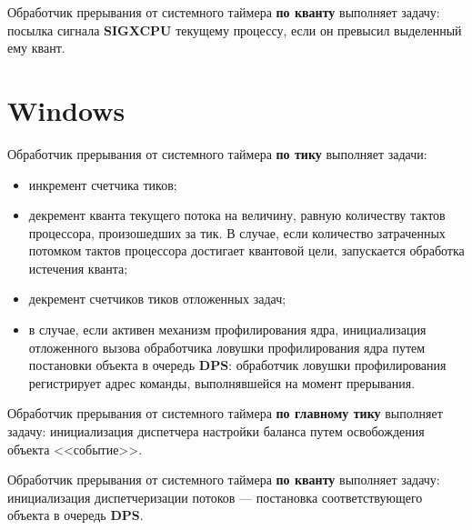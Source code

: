 Обработчик прерывания от системного таймера \textbf{по кванту} выполняет задачу: посылка сигнала \textbf{SIGXCPU} текущему процессу, если он превысил выделенный ему квант.

\section{Windows}

Обработчик прерывания от системного таймера \textbf{по тику} выполняет задачи:
\begin{itemize}
	\item инкремент счетчика тиков;
	\item декремент кванта текущего потока на величину, равную количеству тактов процессора, произошедших за тик. В случае, если количество затраченных потомком тактов процессора достигает квантовой цели, запускается обработка истечения кванта;
	\item декремент счетчиков тиков отложенных задач;
	\item в случае, если активен механизм профилирования ядра, инициализация отложенного вызова обработчика ловушки профилирования ядра путем постановки объекта в очередь \textbf{DPS}: обработчик ловушки профилирования регистрирует адрес команды, выполнявшейся на момент прерывания.
\end{itemize}

Обработчик прерывания от системного таймера \textbf{по главному тику} выполняет задачу: инициализация диспетчера настройки баланса путем освобождения объекта <<событие>>.

Обработчик прерывания от системного таймера \textbf{по кванту} выполняет задачу: инициализация диспетчеризации потоков --- постановка соответствующего объекта в очередь \textbf{DPS}.